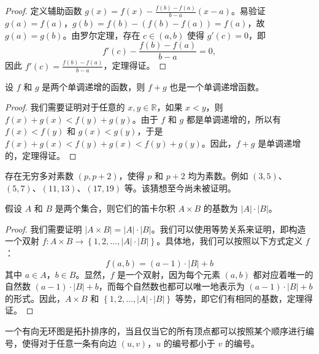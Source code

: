 \begin{proof}
  定义辅助函数 $g(x) = f(x) - \frac{f(b)-f(a)}{b-a}(x-a)$。易验证 $g(a) = f(a)$，$g(b) = f(b) - (f(b)-f(a)) = f(a)$，故 $g(a) = g(b)$。由罗尔定理，存在 $c \in (a,b)$ 使得 $g'(c) = 0$，即
  \begin{equation*}
    f'(c) - \frac{f(b)-f(a)}{b-a} = 0,
  \end{equation*}
  因此 $f'(c) = \frac{f(b)-f(a)}{b-a}$，定理得证。
\end{proof}

\begin{prop}
  设 $f$ 和 $g$ 是两个单调递增的函数，则 $f+g$ 也是一个单调递增函数。
\end{prop}

\begin{proof}
  我们需要证明对于任意的 $x,y \in \mathbb{R}$，如果 $x < y$，则 $f(x)+g(x) < f(y)+g(y)$。由于 $f$ 和 $g$ 都是单调递增的，所以有 $f(x) < f(y)$ 和 $g(x) < g(y)$，于是 $f(x)+g(x) < f(y)+g(x) < f(y)+g(y)$。因此，$f+g$ 是单调递增的，定理得证。
\end{proof}

\begin{conj}[孪生素数猜想]
  存在无穷多对素数 $(p, p+2)$，使得 $p$ 和 $p+2$ 均为素数。例如 $(3,5)$、$(5,7)$、$(11,13)$、$(17,19)$ 等。该猜想至今尚未被证明。
\end{conj}

\begin{assume}
  假设 $A$ 和 $B$ 是两个集合，则它们的笛卡尔积 $A \times B$ 的基数为 $|A| \cdot |B|$。
\end{assume}

\begin{proof}
  我们需要证明 $|A \times B| = |A| \cdot |B|$。我们可以使用等势关系来证明，即构造一个双射 $f: A \times B \rightarrow \left\{1,2,\dots,|A| \cdot |B|\right\}$。具体地，我们可以按照以下方式定义 $f$：
  \begin{equation}
    f(a,b)=(a-1)\cdot |B|+b
  \end{equation}
  其中 $a \in A$，$b \in B$。显然，$f$ 是一个双射，因为每个元素 $(a,b)$ 都对应着唯一的自然数 $(a-1) \cdot |B| + b$，而每个自然数也都可以唯一地表示为 $(a-1) \cdot |B| + b$ 的形式。因此，$A \times B$ 和 $\left\{1,2,\dots,|A| \cdot |B|\right\}$ 等势，即它们有相同的基数，定理得证。
\end{proof}

\begin{dfn}
  一个有向无环图是拓扑排序的，当且仅当它的所有顶点都可以按照某个顺序进行编号，使得对于任意一条有向边 $(u,v)$，$u$ 的编号都小于 $v$ 的编号。
\end{dfn}

